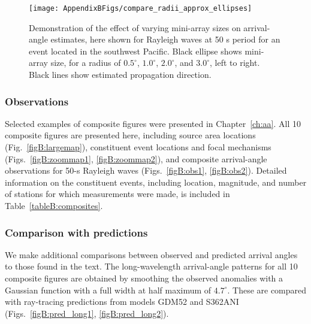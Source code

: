 \documentclass[12pt,oneside]{book}
\newcommand{\degree}[1]{\mbox{$#1^{\circ}$}}
\begin{document}
\begin{figure} 
\begin{center}
\texttt{[image: AppendixBFigs/compare\_radii\_approx\_ellipses]} 
\caption[Effect of mini-array size on arrival-angle estimates]{Demonstration of the effect of varying mini-array sizes on arrival-angle estimates, here shown for Rayleigh waves at 50 s period for an event located in the southwest Pacific. Black ellipse shows mini-array size, for a radius of \degree{0.5}, \degree{1.0}, \degree{2.0}, and \degree{3.0}, left to right. Black lines show estimated propagation direction.  }
\label{figB:aa_radius}
\end{center}
\end{figure}
%

\subsubsection*{Observations}
Selected examples of composite figures were presented in Chapter~\ref{ch:aa}. All 10 composite figures are presented here, including source area locations (Fig.~\ref{figB:largemap}), constituent event locations and focal mechanisms (Figs.~\ref{figB:zoommap1}, \ref{figB:zoommap2}), and composite arrival-angle observations for 50-s Rayleigh waves (Figs.~\ref{figB:obs1}, \ref{figB:obs2}). Detailed information on the constituent events, including location, magnitude, and number of stations for which measurements were made, is included in Table~\ref{tableB:composites}. 

\subsubsection*{Comparison with predictions}
We make additional comparisons between observed and predicted arrival angles to those found in the text. The long-wavelength arrival-angle patterns for all 10 composite figures are obtained by smoothing the observed anomalies with a Gaussian function with a full width at half maximum of \degree{4.7}. These are compared with ray-tracing predictions \citep{Larson1998} from models GDM52 \citep{Ekstrom2011} and S362ANI \citep{Kustowskietal2008} (Figs.~\ref{figB:pred_long1}, \ref{figB:pred_long2}). 
\end{document}
